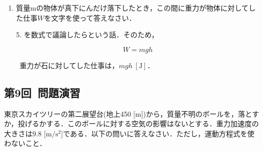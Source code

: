 \documentclass[a4paper,11pt]{ltjsarticle}
\begin{document}
\begin{enumerate}
  このエネルギのことを\textbf{位置エネルギ}という．
  
  
  \item 質量mの物体が真下にんだけ落下したとき，この間に重力が物体に対してした仕事$W$を文字を使って答えなさい．


  5. を数式で議論したらという話．そのため，

  \begin{equation}
    W = mgh
  \end{equation}

 \therefore\ 重力が石に対してした仕事は，$mgh\ [\mathrm{J}]$．
  
\end{enumerate}

\clearpage

\subsection{第9回\ 問題演習}

東京スカイツリーの第二展望台(地上450 [m])から，質量不明のボールを，落とすか，投げるかする．このボールに対する空気の影響はないとする．重力加速度の大きさは9.8 [$\mathrm{m/s^2}$]である．以下の問いに答えなさい．ただし，運動方程式を使わないこと．
\end{document}
